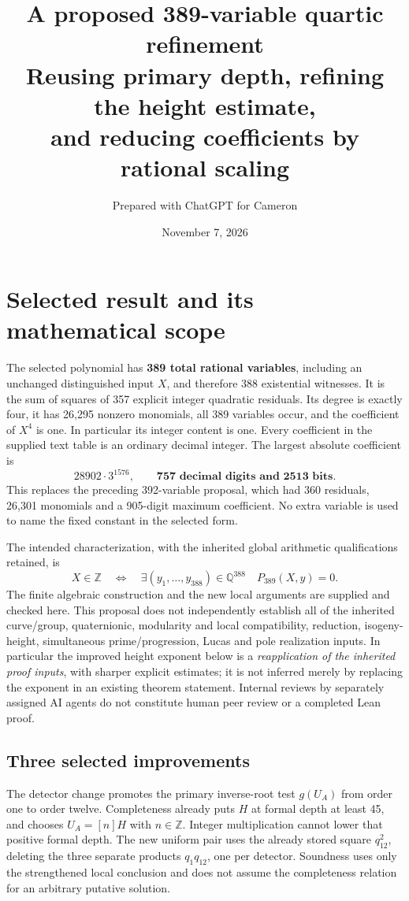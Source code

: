 \documentclass[11pt]{article}
\title{A proposed 389-variable quartic refinement\\[5pt]
\large Reusing primary depth, refining the height estimate,\\
and reducing coefficients by rational scaling}
\author{Prepared with ChatGPT for Cameron}
\date{November 7, 2026}
\newcommand{\Q}{\mathbb Q}\newcommand{\Z}{\mathbb Z}
\begin{document}
\maketitle\thispagestyle{empty}
\section{Selected result and its mathematical scope}

The selected polynomial has \textbf{389 total rational variables}, including
an unchanged distinguished input $X$, and therefore 388 existential
witnesses. It is the sum of squares of 357 explicit integer quadratic
residuals. Its degree is exactly four, it has 26,295 nonzero monomials,
all 389 variables occur, and the coefficient of $X^4$ is one. In particular
its integer content is one. Every coefficient in the supplied text table
is an ordinary decimal integer. The largest absolute coefficient is
\[
 \boxed{28902\cdot3^{1576}},
 \qquad\textbf{757 decimal digits and 2513 bits}.
\]
This replaces the preceding 392-variable proposal, which had 360 residuals,
26,301 monomials and a 905-digit maximum coefficient. No extra variable
is used to name the fixed constant in the selected form.

The intended characterization, with the inherited global arithmetic
qualifications retained, is
\[
 X\in\Z\quad\Longleftrightarrow\quad
 \exists(y_1,\ldots,y_{388})\in\Q^{388}\quad P_{389}(X,y)=0.
\]
The finite algebraic construction and the new local arguments are supplied
and checked here. This proposal does not independently establish all of
the inherited curve/group, quaternionic, modularity and local compatibility,
reduction, isogeny-height, simultaneous prime/progression, Lucas and pole
realization inputs. In particular the improved height exponent below is a
\emph{reapplication of the inherited proof inputs}, with sharper explicit
estimates; it is not inferred merely by replacing the exponent in an
existing theorem statement. Internal reviews by separately assigned AI
agents do not constitute human peer review or a completed Lean proof.

\subsection{Three selected improvements}

The detector change promotes the primary inverse-root test $g(U_A)$ from
order one to order twelve. Completeness already puts $H$ at formal depth
at least 45, and chooses $U_A=[n]H$ with $n\in\Z$. Integer multiplication
cannot lower that positive formal depth. The new uniform pair uses the
already stored square $q_{12}^2$, deleting the three separate products
$q_1q_{12}$, one per detector. Soundness uses only the strengthened
local conclusion and does not assume the completeness relation for an
arbitrary putative solution.
\end{document}
